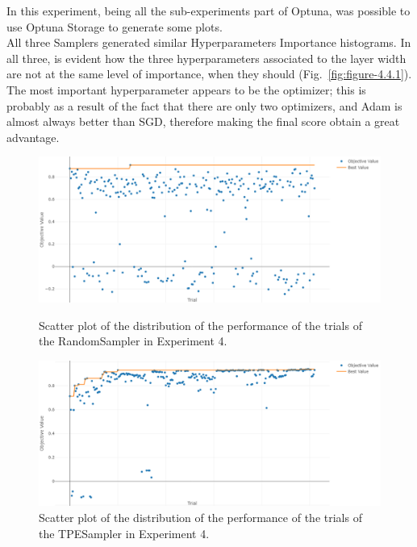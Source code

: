 In this experiment, being all the sub-experiments part of Optuna, was possible to use Optuna Storage to generate some plots.
\\[0.3cm]All three Samplers generated similar Hyperparameters Importance histograms. In all three, is evident how the three hyperparameters associated to the layer width are not at the same level of importance, when they should (Fig.~\ref{fig:figure-4.4.1}).
The most important hyperparameter appears to be the optimizer; this is probably as a result of the fact that there are only two optimizers, and Adam is almost always better than SGD, therefore making the final score obtain a great advantage.
\begin{figure}[H]
    \begin{minipage}{\textwidth}
        \centering
        \includegraphics[width=13.8cm]{figures/figure-4.4.2.png}
        \caption[Trials Performance Distribution of RandomSampler - Experiment 4]{Scatter plot of the distribution of the performance of the trials of the RandomSampler in Experiment 4.}
        \label{fig:figure-4.4.2}
    \end{minipage}

    \begin{minipage}{\textwidth}
        \centering
        \includegraphics[width=13.8cm]{figures/figure-4.4.3.png}
        \caption[Trials Performance Distribution of TPESampler - Experiment 4]{Scatter plot of the distribution of the performance of the trials of the TPESampler in Experiment 4.}
        \label{fig:figure-4.4.3}
    \end{minipage}


\end{figure}
